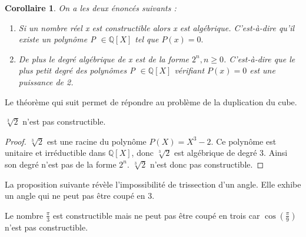 \documentclass[a4paper,12pt,french,draft]{report}
\newtheorem{corollaire}{Corollaire}[section]
\begin{document}
             \begin{corollaire}
            
               
                On a les deux énoncés suivants :
             \begin{enumerate}    
                \item Si un nombre réel x est constructible alors x est algébrique. 
                   C'est-à-dire qu'il existe un polynôme P \( \in \mathbb{Q}[X] 
                   \) tel que \(P(x)=0.\)
                \item De plus le degré algébrique de x est de la 
                forme \( 2^{n},n \ge 0 \). C'est-à-dire que le plus 
                petit degré des polynômes P \( \in \mathbb{Q}[X] \) 
                vérifiant \(P(x)=0\) est une puissance de 2.
             \end{enumerate}      
             \end{corollaire}
             
             Le théorème qui suit permet de répondre au problème de la duplication du cube.
             
             \begin{theorem}
             
             \(\sqrt[3]{2}\) n'est pas constructible.
             
             \end{theorem}
             
             \begin{proof}
             
             \(\sqrt[3]{2}\) est une racine du polynôme 
             \(P(X)=X^{3}-2\). Ce polynôme est unitaire et 
             irréductible dans \(\mathbb{Q}[X]\), donc \(\sqrt[3]{2}\) 
             est algébrique de degré 3. Ainsi son degré n'est pas de 
             la forme \(2^{n}\). \(\sqrt[3]{2}\) n'est donc pas 
             constructible.
             
             \end{proof}
          
          La proposition suivante révèle l'impossibilité de 
          trissection d'un angle. Elle exhibe un angle qui ne peut pas 
          être coupé en 3.
          
             \begin{theorem}
             
             Le nombre \(\frac{\pi}{3}\) est constructible mais ne peut 
             pas être coupé en trois car \(\cos (\frac{\pi}{9})\) n'est pas 
             constructible.
          
          
          
             \end{theorem}
        
\end{document}
